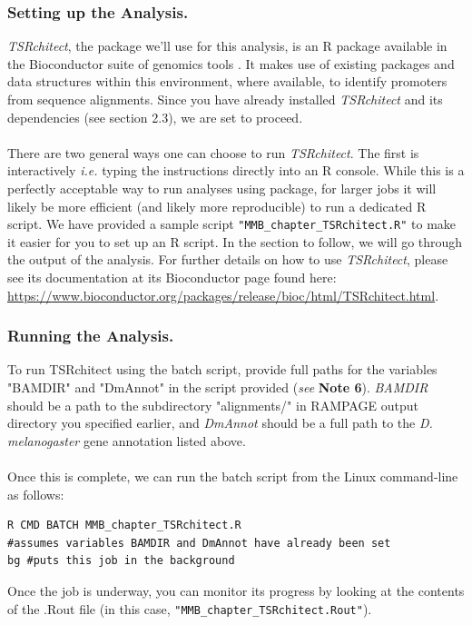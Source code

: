 \documentclass[runningheads,a4paper]{llncs}
\begin{document}
\begin{linenumbers}
\subsubsection{Setting up the Analysis.}
\textit{TSRchitect}, the package we'll use for this analysis, is an R package available in the Bioconductor suite of genomics tools \cite{Lawrence:2014gy}.
It makes use of existing packages and data structures within this environment, where available, to identify promoters from sequence alignments.
Since you have already installed \textit{TSRchitect} and its dependencies (see section 2.3), we are set to proceed.\\
\\
There are two general ways one can choose to run \textit{TSRchitect}. 
The first is interactively \textit{i.e.} typing the instructions directly into an R console.
While this is a perfectly acceptable way to run analyses using package, for larger jobs it will likely be more efficient (and likely more reproducible) to run a dedicated R script.
We have provided a sample script \texttt{"MMB\_chapter\_TSRchitect.R"} to make it easier for you to set up an R script. 
In the section to follow, we will go through the output of the analysis. 
For further details on how to use \textit{TSRchitect}, please see its documentation at its Bioconductor page found here: \url{https://www.bioconductor.org/packages/release/bioc/html/TSRchitect.html}.

\subsubsection{Running the Analysis.}
To run TSRchitect using the batch script, provide full paths for the variables "BAMDIR" and "DmAnnot" in the script provided (\textit{see} \textbf{Note 6}).
\textit{BAMDIR} should be a path to the subdirectory "alignments/" in RAMPAGE output directory you specified earlier, and \textit{DmAnnot} should be a full path to the \textit{D. melanogaster} gene annotation listed above.\\
\\
Once this is complete, we can run the batch script from the Linux command-line as follows:

\noindent
\begin{verbatim}
R CMD BATCH MMB_chapter_TSRchitect.R
#assumes variables BAMDIR and DmAnnot have already been set
bg #puts this job in the background
\end{verbatim}

\noindent
Once the job is underway, you can monitor its progress by looking at the contents of the .Rout file (in this case, \texttt{"MMB\_chapter\_TSRchitect.Rout"}). 


\end{linenumbers}
\end{document}
